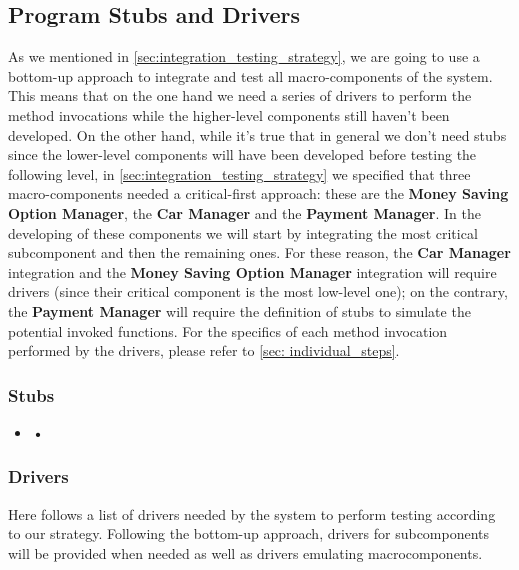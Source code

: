 	\subsection{Program Stubs and Drivers}
	
	As we mentioned in \autoref{sec:integration_testing_strategy}, we are going to use a bottom-up approach to integrate and test all macro-components of the system. This means that on the one hand we need a series of drivers to perform the method invocations while the higher-level components still haven't been developed. On the other hand, while it's true that in general we don't need stubs since the lower-level components will have been developed before testing the following level, in \autoref{sec:integration_testing_strategy} we specified that three macro-components needed a critical-first approach: these are the \textbf{Money Saving Option Manager}, the \textbf{Car Manager} and the \textbf{Payment Manager}. In the developing of these components we will start by integrating the most critical subcomponent and then the remaining ones. For these reason, the \textbf{Car Manager} integration and the \textbf{Money Saving Option Manager} integration will require drivers (since their critical component is the most low-level one); on the contrary, the \textbf{Payment Manager} will require the definition of stubs to simulate the potential invoked functions.
	For the specifics of each method invocation performed by the drivers, please refer to \autoref{sec: individual_steps}.
		
		\subsubsection{Stubs}
				
			\begin{itemize}
				\item \textbf{•} %
			\end{itemize}
		
		
		\subsubsection{Drivers}
		
		Here follows a list of drivers needed by the system to perform testing according to our strategy. Following the bottom-up approach, drivers for subcomponents will be provided when needed as well as drivers emulating macrocomponents.
		
